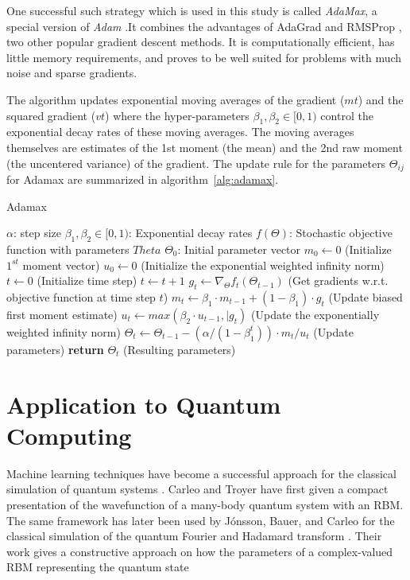 One successful such strategy which is used in this study is called \textit{AdaMax}, a special version 
of \textit{Adam} \cite{kingma2014adam}.It combines the advantages of AdaGrad \cite{duchi2011adaptive} and RMSProp \cite{bengio2015rmsprop},
two other popular gradient descent methods. It is computationally efficient, has little
memory requirements, and proves to be well suited for problems with much noise and sparse gradients.

The algorithm updates exponential moving averages of the gradient ($mt$) and the squared gradient
($vt$) where the hyper-parameters $\beta_1, \beta_2 \in [0, 1)$ control the exponential decay rates of these moving
averages. The moving averages themselves are estimates of the 1st moment (the mean) and the
2nd raw moment (the uncentered variance) of the gradient. The update rule for the parameters $\Theta_{ij}$ for Adamax are summarized in 
algorithm~\ref{alg:adamax}.

\begin{algorithm}
    \label{alg:adamax}
    \caption{Adamax}\label{euclid}
    \begin{algorithmic}[1]
        \Require $\alpha$: step size
        \Require $\beta_1, \beta_2 \in [0,1)$: Exponential decay rates
        \Require $f(\Theta)$: Stochastic objective function with parameters $Theta$
        \Require $\Theta_0$: Initial parameter vector
        \State $m_0 \gets 0$ (Initialize $1^{st}$ moment vector)
        \State $u_0 \gets 0$ (Initialize the exponential weighted infinity norm)
        \State $t \gets 0$ (Initialize time step)
            \State $t\gets t+1$
            \State $g_t \gets \nabla_{\Theta}f_t(\Theta_{t-1})$ (Get gradients w.r.t. objective function at time step $t$)
            \State $m_t \gets \beta_1 \cdot m_{t-1} + (1-\beta_1) \cdot g_t$ (Update biased first moment estimate)
            \State $u_t \gets max(\beta_2 \cdot u_{t-1}, \vert{g_t})$ (Update the exponentially weighted infinity norm)
            \State $\Theta_t \gets \Theta_{t-1} - (\alpha/ (1-\beta_1^t)) \cdot m_t/u_t$ (Update parameters)
        \EndWhile
        \State \textbf{return} $\Theta_t$ (Resulting parameters)
    \end{algorithmic}
\end{algorithm}

\section{Application to Quantum Computing}
\label{sec:applicationToQuantumComputing}
Machine learning techniques have become a successful approach for the classical simulation
of quantum systems \cite{carleo2017solving, deng2017quantum, carleo2018constructing}. 
Carleo and Troyer \cite{carleo2017solving} have first given a compact presentation of the wavefunction of a many-body quantum system with an RBM.
The same framework has later been used by J\'{o}nsson, Bauer, and Carleo for the classical simulation of the quantum Fourier and Hadamard transform \cite{jnsson2018neuralnetwork}. Their work gives a constructive approach on how the parameters of a complex-valued RBM representing the quantum state

